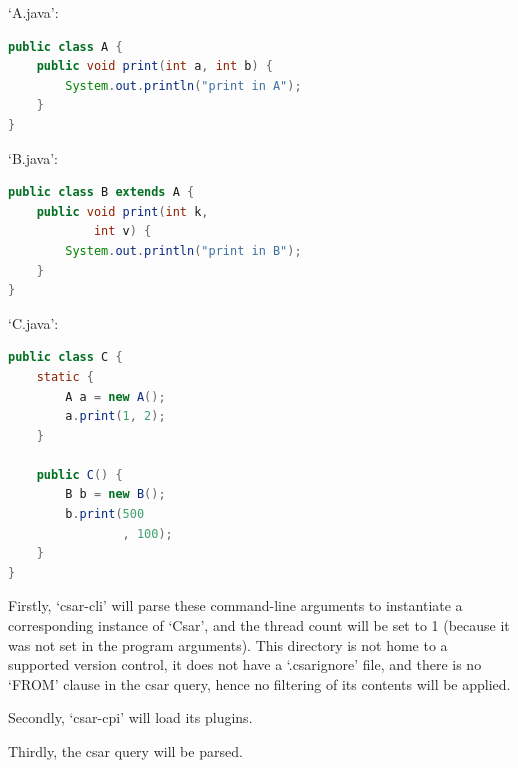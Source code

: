 \documentclass[12pt, letterpaper]{article}
\begin{document}
`A.java':
\begin{lstlisting}[language=Java]
public class A {
    public void print(int a, int b) {
        System.out.println("print in A");
    }
}
\end{lstlisting}

`B.java':
\begin{lstlisting}[language=Java]
public class B extends A {
    public void print(int k,
            int v) {
        System.out.println("print in B");
    }
}
\end{lstlisting}

`C.java':
\begin{lstlisting}[language=Java]
public class C {
    static {
        A a = new A();
        a.print(1, 2);
    }
    
    public C() {
        B b = new B();
        b.print(500
                , 100);
    }
}
\end{lstlisting}

Firstly, `csar-cli' will parse these command-line arguments to instantiate a corresponding instance of `Csar', and the thread count will be set to 1 (because it was not set in the program arguments).
This directory is not home to a supported version control, it does not have a `.csarignore' file, and there is no `FROM' clause in the csar query, hence no filtering of its contents will be applied.

Secondly, `csar-cpi' will load its plugins.

Thirdly, the csar query will be parsed.
\end{document}
